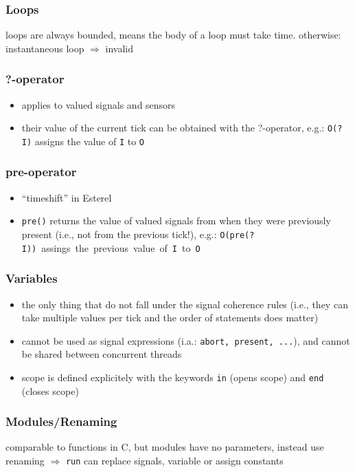 \documentclass[german]{latex4ei/latex4ei_sheet}
\begin{document}
{\subsubsection{Loops}
loops are always bounded, means the body of a loop must take time. otherwise: instantaneous loop $\Rightarrow$ invalid

\subsubsection{?-operator}
\begin{itemize}
\item applies to valued signals and sensors
\item their value of the current tick can be obtained with the ?-operator, e.g.: \texttt{O(?I)} assigns the value of \texttt{I} to \texttt{O}
\end{itemize}

\subsubsection{pre-operator}
\begin{itemize}
\item "`timeshift"' in Esterel
\item \texttt{pre()} returns the value of valued signals from when they were previously present (i.e., not from the
previous tick!), e.g.: \mbox{\texttt{O(pre(?I))} assings the previous value of \texttt{I} to \texttt{O}}
\end{itemize}

\subsubsection{Variables}
\begin{itemize}
\item the only thing that do not fall under the signal coherence rules (i.e., they can take multiple values per tick and the order of statements does matter)
\item cannot be used as signal expressions (i.a.: \texttt{abort, present, ...}), and cannot be shared between concurrent threads
\item scope is defined explicitely with the keywords \texttt{in} (opens scope) and \texttt{end} (closes scope)
\end{itemize}

\subsubsection{Modules/Renaming}
comparable to functions in C, but modules have no parameters, instead use renaming $\Rightarrow$ \texttt{run} can replace signals, variable or assign constants
}
\end{document}
